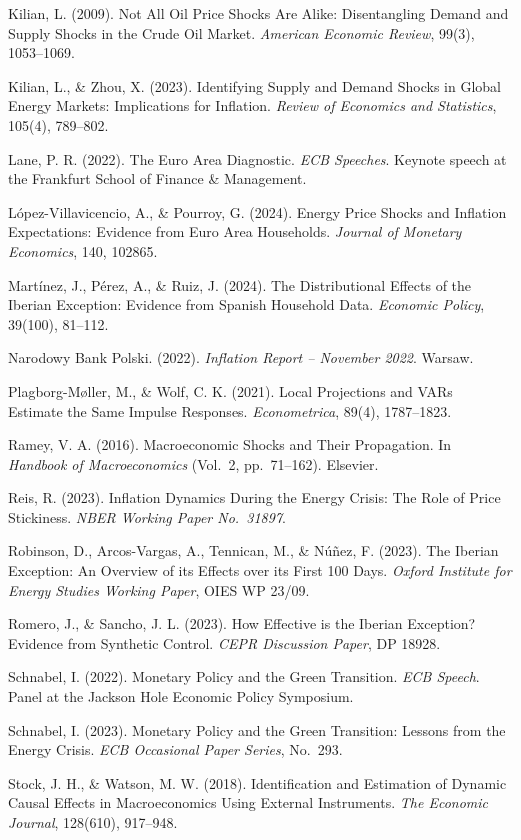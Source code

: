 \documentclass[12pt, a4paper]{article}
\begin{document}
\hangindent=0.5cm Kilian, L. (2009). Not All Oil Price Shocks Are Alike: Disentangling Demand and Supply Shocks in the Crude Oil Market. \textit{American Economic Review}, 99(3), 1053--1069.

\hangindent=0.5cm Kilian, L., \& Zhou, X. (2023). Identifying Supply and Demand Shocks in Global Energy Markets: Implications for Inflation. \textit{Review of Economics and Statistics}, 105(4), 789--802.

\hangindent=0.5cm Lane, P. R. (2022). The Euro Area Diagnostic. \textit{ECB Speeches}. Keynote speech at the Frankfurt School of Finance \& Management.

\hangindent=0.5cm L\'{o}pez-Villavicencio, A., \& Pourroy, G. (2024). Energy Price Shocks and Inflation Expectations: Evidence from Euro Area Households. \textit{Journal of Monetary Economics}, 140, 102865.

\hangindent=0.5cm Mart\'{i}nez, J., P\'{e}rez, A., \& Ruiz, J. (2024). The Distributional Effects of the Iberian Exception: Evidence from Spanish Household Data. \textit{Economic Policy}, 39(100), 81--112.

\hangindent=0.5cm Narodowy Bank Polski. (2022). \textit{Inflation Report -- November 2022}. Warsaw.

\hangindent=0.5cm Plagborg-M{\o}ller, M., \& Wolf, C. K. (2021). Local Projections and VARs Estimate the Same Impulse Responses. \textit{Econometrica}, 89(4), 1787--1823.

\hangindent=0.5cm Ramey, V. A. (2016). Macroeconomic Shocks and Their Propagation. In \textit{Handbook of Macroeconomics} (Vol.\ 2, pp.\ 71--162). Elsevier.

\hangindent=0.5cm Reis, R. (2023). Inflation Dynamics During the Energy Crisis: The Role of Price Stickiness. \textit{NBER Working Paper No.\ 31897}.

\hangindent=0.5cm Robinson, D., Arcos-Vargas, A., Tennican, M., \& N\'{u}\~{n}ez, F. (2023). The Iberian Exception: An Overview of its Effects over its First 100 Days. \textit{Oxford Institute for Energy Studies Working Paper}, OIES WP 23/09.

\hangindent=0.5cm Romero, J., \& Sancho, J. L. (2023). How Effective is the Iberian Exception? Evidence from Synthetic Control. \textit{CEPR Discussion Paper}, DP 18928.

\hangindent=0.5cm Schnabel, I. (2022). Monetary Policy and the Green Transition. \textit{ECB Speech}. Panel at the Jackson Hole Economic Policy Symposium.

\hangindent=0.5cm Schnabel, I. (2023). Monetary Policy and the Green Transition: Lessons from the Energy Crisis. \textit{ECB Occasional Paper Series}, No.\ 293.

\hangindent=0.5cm Stock, J. H., \& Watson, M. W. (2018). Identification and Estimation of Dynamic Causal Effects in Macroeconomics Using External Instruments. \textit{The Economic Journal}, 128(610), 917--948.
\end{document}
